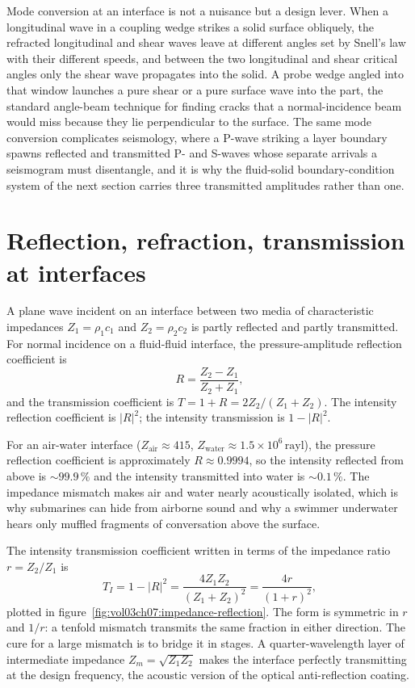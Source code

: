 Mode conversion at an interface is not a nuisance but a design lever. When a
longitudinal wave in a coupling wedge strikes a solid surface obliquely, the
refracted longitudinal and shear waves leave at different angles set by
Snell's law with their different speeds, and between the two longitudinal
and shear critical angles only the shear wave propagates into the solid. A
probe wedge angled into that window launches a pure shear or a pure surface
wave into the part, the standard angle-beam technique for finding cracks
that a normal-incidence beam would miss because they lie perpendicular to
the surface. The same mode conversion complicates seismology, where a P-wave
striking a layer boundary spawns reflected and transmitted P- and S-waves
whose separate arrivals a seismogram must disentangle, and it is why the
fluid-solid boundary-condition system of the next section carries three
transmitted amplitudes rather than one.

\section{Reflection, refraction, transmission at interfaces}

A plane wave incident on an interface between two media of
characteristic impedances $Z_1 = \rho_1 c_1$ and $Z_2 = \rho_2 c_2$
is partly reflected and partly transmitted. For normal incidence on
a fluid-fluid interface, the pressure-amplitude reflection coefficient
is
\[
R = \frac{Z_2 - Z_1}{Z_2 + Z_1},
\]
and the transmission coefficient is $T = 1 + R = 2Z_2/(Z_1 + Z_2)$.
The intensity reflection coefficient is $|R|^2$; the intensity
transmission is $1 - |R|^2$.

For an air-water interface ($Z_{\text{air}} \approx 415$, $Z_{\text{
water}} \approx 1.5\times 10^{6}\,\text{rayl}$), the pressure
reflection coefficient is approximately $R \approx 0.9994$, so the
intensity reflected from above is $\sim 99.9\,\%$ and the intensity
transmitted into water is $\sim 0.1\,\%$. The impedance mismatch
makes air and water nearly acoustically isolated, which is why
submarines can hide from airborne sound and why a swimmer underwater
hears only muffled fragments of conversation above the surface.



The intensity transmission coefficient written in terms of the
impedance ratio $r = Z_2/Z_1$ is
\[
T_I = 1 - |R|^2 = \frac{4 Z_1 Z_2}{(Z_1 + Z_2)^2}
    = \frac{4r}{(1+r)^2},
\]
plotted in figure~\ref{fig:vol03ch07:impedance-reflection}. The form is
symmetric in $r$ and $1/r$: a tenfold mismatch transmits the same
fraction in either direction. The cure for a large mismatch is to
bridge it in stages. A quarter-wavelength layer of intermediate
impedance $Z_m = \sqrt{Z_1 Z_2}$ makes the interface perfectly
transmitting at the design frequency, the acoustic version of the
optical anti-reflection coating.

